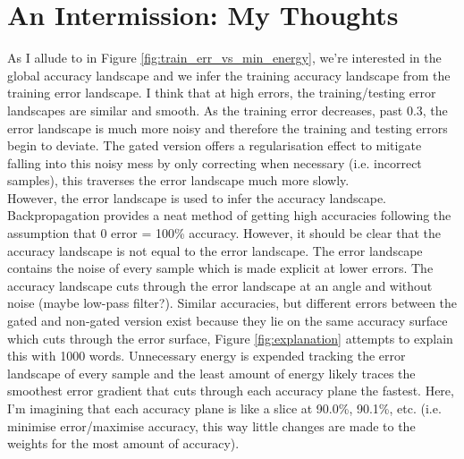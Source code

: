 \documentclass[prl,superscriptaddress,showpacs,twocolumn]{revtex4-1}
\begin{document}
\section{An Intermission: My Thoughts}
As I allude to in Figure \ref{fig:train_err_vs_min_energy}, we're interested in the global accuracy landscape and we infer the training accuracy landscape from the training error landscape. I think that at high errors, the training/testing error landscapes are similar and smooth. As the training error decreases, past 0.3, the error landscape is much more noisy and therefore the training and testing errors begin to deviate. The gated version offers a regularisation effect to mitigate falling into this noisy mess by only correcting when necessary (i.e. incorrect samples), this traverses the error landscape much more slowly. \\
\indent
However, the error landscape is used to infer the accuracy landscape. Backpropagation provides a neat method of getting high accuracies following the assumption that 0 error = 100\% accuracy. However, it should be clear that the accuracy landscape is not equal to the error landscape. The error landscape contains the noise of every sample which is made explicit at lower errors. The accuracy landscape cuts through the error landscape at an angle and without noise (maybe low-pass filter?). Similar accuracies, but different errors between the gated and non-gated version exist because they lie on the same accuracy surface which cuts through the error surface, Figure \ref{fig:explanation} attempts to explain this with 1000 words. Unnecessary energy is expended tracking the error landscape of every sample and the least amount of energy likely traces the smoothest error gradient that cuts through each accuracy plane the fastest. Here, I'm imagining that each accuracy plane is like a slice at 90.0\%, 90.1\%, etc. (i.e. minimise error/maximise accuracy, this way little changes are made to the weights for the most amount of accuracy).\\
\end{document}
